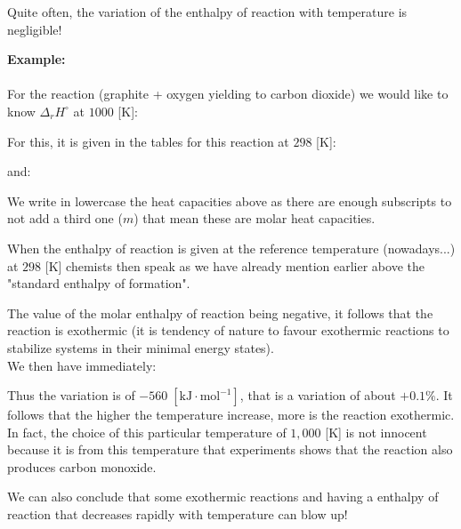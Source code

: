 	\begin{tcolorbox}[title=Remark,arc=10pt,breakable,drop lifted shadow,
  skin=enhanced,
  skin first is subskin of={enhancedfirst}{arc=10pt,no shadow},
  skin middle is subskin of={enhancedmiddle}{arc=10pt,no shadow},
  skin last is subskin of={enhancedlast}{drop lifted shadow}]
	Quite often, the variation of the enthalpy of reaction with temperature is negligible!
	\end{tcolorbox}
	\begin{tcolorbox}[colframe=black,colback=white,sharp corners,breakable]
	\textbf{{\Large {}}Example:}\\\\
	For the reaction (graphite + oxygen yielding to carbon dioxide) we would like to know $\Delta_r H^\circ$ at $1000$ [K]:
	
	For this, it is given in the tables for this reaction at $298$ [K]:
	
	and:
	
	We write in lowercase the heat capacities above as there are enough subscripts to not add a third one ($m$) that mean these are molar heat capacities.
	\begin{tcolorbox}[title=Remark,arc=10pt,breakable,drop lifted shadow,
  skin=enhanced,
  skin first is subskin of={enhancedfirst}{arc=10pt,no shadow},
  skin middle is subskin of={enhancedmiddle}{arc=10pt,no shadow},
  skin last is subskin of={enhancedlast}{drop lifted shadow}]
	When the enthalpy of reaction is given at the reference temperature (nowadays...) at $298$ [K] chemists then speak as we have already mention earlier above the "standard enthalpy of formation".
	\end{tcolorbox}
	The value of the molar enthalpy of reaction being negative, it follows that the reaction is exothermic (it is tendency of nature to favour exothermic reactions to stabilize systems in their minimal energy states).\\
	
	We then have immediately:
	
	Thus the variation is of $-560\;[\text{kJ}\cdot \text{mol}^{-1}]$, that is a variation of about $+0.1\%$. It follows that the higher the temperature increase, more is the reaction exothermic. In fact, the choice of this particular temperature of $1,000$ [K] is not innocent because it is from this temperature that experiments shows that the reaction also produces carbon monoxide.
	\end{tcolorbox}
	We can also conclude that some exothermic reactions and having a enthalpy of reaction that decreases rapidly with temperature can blow up!
	
